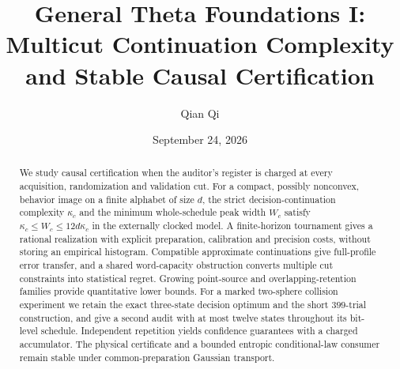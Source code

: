 
\usepackage{tikz}
\usetikzlibrary{arrows.meta,positioning}
\newcommand{\Wone}{W_1}
\newcommand{\Del}{\Delta}
\newcommand{\emptyw}{\varnothing}
\newcommand{\osc}{\operatorname{osc}}
\newcommand{\diam}{\operatorname{diam}}
\newcommand{\Lipone}{\operatorname{Lip}_1}
\newcommand{\aff}{\operatorname{aff}}
\newcommand{\conv}{\operatorname{conv}}
\newcommand{\rplus}{\operatorname{rank}_{+}}
\newcommand{\dpr}{\delta^{\rm p}}
\newcommand{\dhi}{\delta^{\rm h}}
\newcommand{\dvi}{\delta^{\rm v}}
\newcommand{\dmix}{\delta^{\rm mix}}
\newcommand{\cK}{\mathcal K}
\newcommand{\cB}{\mathcal B}
\newcommand{\cI}{\mathcal I}
\newcommand{\KL}{\operatorname{KL}}
\newcommand{\vaudit}{v^{\rm aud}}
\title[General Theta Foundations I]{General Theta Foundations I:\\Multicut Continuation Complexity\\and Stable Causal Certification}
\author{Qian Qi}
\date{September 24, 2026}

\begin{abstract}
We study causal certification when the auditor's register is charged at
every acquisition, randomization and validation cut. For a compact,
possibly nonconvex, behavior image on a finite alphabet of size $d$, the
strict decision-continuation complexity $\kappa_c$ and the minimum
whole-schedule peak width $W_c$ satisfy $\kappa_c\le W_c\le12d\kappa_c$
in the externally clocked model. A finite-horizon tournament gives a
rational realization with explicit preparation, calibration and
precision costs, without storing an empirical histogram. Compatible
approximate continuations give full-profile error transfer, and a shared
word-capacity obstruction converts multiple cut constraints into
statistical regret. Growing point-source and overlapping-retention
families provide quantitative lower bounds. For a marked two-sphere
collision experiment we retain the exact three-state decision optimum
and the short $399$-trial construction, and give a second audit with at
most twelve states throughout its bit-level schedule. Independent
repetition yields confidence guarantees with a charged accumulator.
The physical certificate and a bounded entropic conditional-law consumer
remain stable under common-preparation Gaussian transport.
\end{abstract}
\maketitle
\tableofcontents
